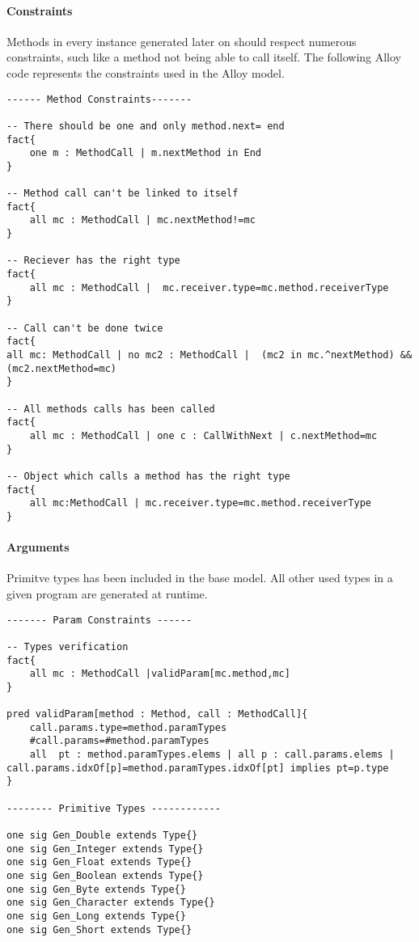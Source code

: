 \paragraph{Constraints}
Methods in every instance generated later on should respect numerous constraints, such like a method not being able to call itself. The following Alloy code represents the constraints used in the Alloy model. 

\begin{lstlisting}
------ Method Constraints-------

-- There should be one and only method.next= end
fact{
    one m : MethodCall | m.nextMethod in End
}

-- Method call can't be linked to itself
fact{
    all mc : MethodCall | mc.nextMethod!=mc
}

-- Reciever has the right type
fact{
    all mc : MethodCall |  mc.receiver.type=mc.method.receiverType
}

-- Call can't be done twice
fact{
all mc: MethodCall | no mc2 : MethodCall |  (mc2 in mc.^nextMethod) && (mc2.nextMethod=mc)
}

-- All methods calls has been called
fact{
    all mc : MethodCall | one c : CallWithNext | c.nextMethod=mc
}

-- Object which calls a method has the right type
fact{
    all mc:MethodCall | mc.receiver.type=mc.method.receiverType
}
\end{lstlisting}
\paragraph{Arguments} Primitve types has been included in the base model. All other used types in a given program are generated at runtime. 
\begin{lstlisting}
------- Param Constraints ------

-- Types verification 
fact{
    all mc : MethodCall |validParam[mc.method,mc]
}

pred validParam[method : Method, call : MethodCall]{
	call.params.type=method.paramTypes
	#call.params=#method.paramTypes
    all  pt : method.paramTypes.elems | all p : call.params.elems | call.params.idxOf[p]=method.paramTypes.idxOf[pt] implies pt=p.type
}

-------- Primitive Types ------------

one sig Gen_Double extends Type{}
one sig Gen_Integer extends Type{}
one sig Gen_Float extends Type{}
one sig Gen_Boolean extends Type{}
one sig Gen_Byte extends Type{}
one sig Gen_Character extends Type{}
one sig Gen_Long extends Type{}
one sig Gen_Short extends Type{}
\end{lstlisting}

